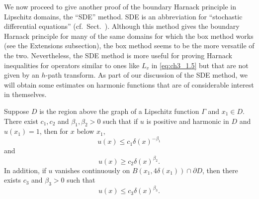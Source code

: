 

We now proceed to give another proof of the boundary Harnack principle in Lipschitz domains, the ``SDE'' method. SDE is an abbreviation for ``stochastic differential equations'' (cf.\ Sect.\ ). Although this method gives the boundary Harnack principle for many of the same domains for which the box method works (see the Extensions subsection), the box method seems to be the more versatile of the two. Nevertheless, the SDE method is more useful for proving Harnack inequalities for operators similar to ones like $L_v$ in \eqref{eq:ch3_1.5} but that are not given by an $h$-path transform. As part of our discussion of the SDE method, we will obtain some estimates on harmonic functions that are of considerable interest in themselves.

\begin{lemma}\label{lem:ch3_1.9}
Suppose $D$ is the region above the graph of a Lipschitz function $\Gamma$ and $x_1 \in D$. There exist $c_1,c_2$ and $\beta_1,\beta_2 > 0$ such that if $u$ is positive and harmonic in $D$ and $u(x_1) = 1$, then for $x$ below $x_1$,
\mpagebreak
\begin{equation}\label{eq:ch3_1.20}
    u(x) \leq c_1\delta(x)^{-\beta_1}
\end{equation}
and
\begin{equation}\label{eq:ch3_1.21}
    u(x) \geq c_2\delta(x)^{\beta_2}.
\end{equation}
In addition, if $u$ vanishes continuously on $B(x_1,4\delta(x_1)) \cap \partial D$, then there exists $c_3$ and $\beta_3 > 0$ such that
\begin{equation}\label{eq:ch3_1.22}
    u(x) \leq c_3\delta(x)^{\beta_3}.
\end{equation}
\end{lemma}


